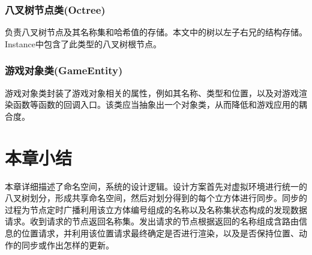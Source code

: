 \subsubsection{八叉树节点类(Octree)}
负责八叉树节点及其名称集和哈希值的存储。本文中的树以左子右兄的结构存储。Instance中包含了此类型的八叉树根节点。
\subsubsection{游戏对象类(GameEntity)}
游戏对象类封装了游戏对象相关的属性，例如其名称、类型和位置，以及对游戏渲染函数等函数的回调入口。该类应当抽象出一个对象类，从而降低和游戏应用的耦合度。
\section{本章小结}
本章详细描述了命名空间，系统的设计逻辑。设计方案首先对虚拟环境进行统一的八叉树划分，形成共享命名空间，然后对划分得到的每个立方体进行同步。同步的过程为节点定时广播利用该立方体编号组成的名称以及名称集状态构成的发现数据请求。收到请求的节点返回名称集。发出请求的节点根据返回的名称组成含路由信息的位置请求，并利用该位置请求最终确定是否进行渲染，以及是否保持位置、动作的同步或作出怎样的更新。
